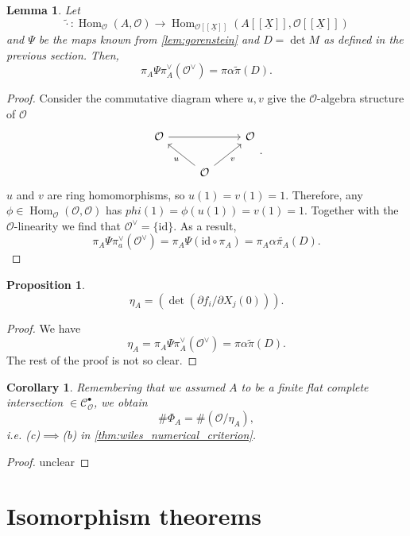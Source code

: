 \documentclass{article}
\theoremstyle{plain}%
\newtheorem{lemma}{Lemma}[section]
\newtheorem{proposition}{Proposition}[section]
\newtheorem{corollary}{Corollary}[section]
\theoremstyle{definition}
\theoremstyle{remark}
\newcommand{\cob}{\mathcal{C}_\mathcal{O}^\bullet}
\renewcommand{\hom}{\operatorname{Hom}}
\begin{document}
\begin{lemma}
    Let 
    \[
        \!\tilde{\cdot}\colon \hom_\mathcal{O}(A, \mathcal{O}) \to 
        \hom_{\mathcal{O}[[\underline{X}]]}(A[[\underline{X}]], \mathcal{O}[[\underline{X}]])
    \]
    and \(\Psi\)
    be the maps known from \cref{lem:gorenstein} and \(D = \det M\) as defined in the previous section.
    Then,
    \[
        \pi_A \Psi \pi_A^\vee(\mathcal{O}^\vee) = \pi\alpha \tilde \pi(D).
    \]
\end{lemma}
\begin{proof}
    Consider the commutative diagram where \(u, v\) give the \(\mathcal{O}\)-algebra structure of \(\mathcal{O}\)
    \[
        \begin{tikzcd}
            \mathcal{O} \arrow[rr] & & \mathcal{O}\\
            &\mathcal{O} \arrow[ul, "u"] \arrow[ur, "v", swap]&
        \end{tikzcd}.
    \]
    \(u\) and \(v\) are ring homomorphisms, so \(u(1) = v(1) = 1\).
    Therefore, any \(\phi \in \hom_\mathcal{O}(\mathcal{O}, \mathcal{O})\) has \(phi(1) = \phi(u(1)) = v(1) = 1\).
    Together with the \(\mathcal{O}\)-linearity we find that \(\mathcal{O}^\vee = \{\mathrm{id}\}\).
    As a result,
    \[
        \pi_A\Psi\pi_a^\vee(\mathcal{O}^\vee) = \pi_A\Psi(\mathrm{id} \circ \pi_A) = \pi_A \alpha \tilde{\pi_A}(D).  
    \]
\end{proof}

\begin{proposition}\cite[proposition 5.19]{darmon1995fermat}
    \[
        \eta_A = (\det(\partial f_i/\partial X_j(0))).
    \]
\end{proposition}
\begin{proof}
    We have \[
        \eta_A = \pi_A \Psi \pi_A^\vee(\mathcal{O}^\vee) = \pi\alpha \tilde \pi(D).
    \]
    The rest of the proof is not so clear.
\end{proof}

\begin{corollary}\cite[corollary 5.20]{darmon1995fermat}
    Remembering that we assumed \(A\) to be a finite flat complete intersection \(\in \cob\), we obtain
    \[
        \# \Phi_A = \# (\mathcal{O}/\eta_A),
    \]
    i.e. (c)\(\implies\)(b) in \cref{thm:wiles_numerical_criterion}.
\end{corollary}
\begin{proof}
    unclear
\end{proof}

\section{Isomorphism theorems}
\end{document}
